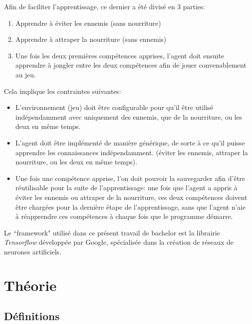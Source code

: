 \documentclass[11pt,a4paper]{report}
\begin{document}
  \par Afin de faciliter l'apprentissage, ce dernier a été divisé en 3 parties: 
  
  \begin{enumerate} 
  \item Apprendre à éviter les ennemis (sans nourriture)
  \item Apprendre à attraper la nourriture (sans ennemis)
  \item Une fois les deux premières compétences apprises, l'agent doit ensuite apprendre à jongler entre les deux compétences afin de jouer convenablement au jeu. 
  \end{enumerate}
  
  \par Cela implique les contraintes suivantes: 
  
  \begin{itemize}
  \item L'environnement (jeu) doit être configurable pour qu'il être utilisé indépendamment avec uniquement des ennemis, que de la nourriture, ou les deux en même temps. 
  \item L'agent doit être implémenté de manière générique, de sorte à ce qu'il puisse apprendre les connaissances indépendamment. (éviter les ennemis, attraper la nourriture, ou les deux en même temps). 
  \item Une fois une compétence apprise, l'on doit pouvoir la sauvegarder afin d'être réutilisable pour la suite de l'apprentissage: une fois que l'agent a appris à éviter les ennemis ou attraper de la nourriture, ces deux compétences doivent être chargées pour la dernière étape de l'apprentissage, sans que l'agent n'aie à réapprendre ces compétences à chaque fois que le programme démarre. 
  \end{itemize}
  
  \par Le ``framework" utilisé dans ce présent travail de bachelor est la librairie \textit{Tensorflow} développée par Google, spécialisée dans la création de réseaux de neurones artificiels. 
  
  \chapter{Théorie}
  
  \section{Définitions}
  
\end{document}
